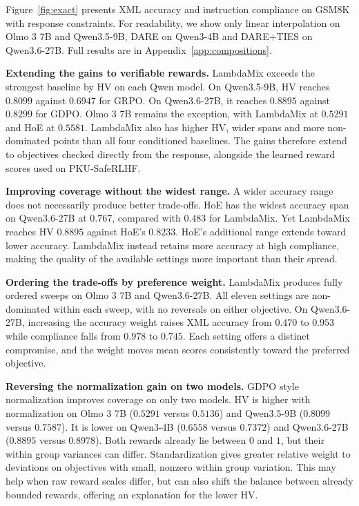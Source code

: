 \documentclass{article} %
\begin{document}
Figure~\ref{fig:exact} presents XML accuracy and instruction compliance on GSM8K with response constraints. For readability, we show only linear interpolation on Olmo 3 7B and Qwen3.5-9B, DARE on Qwen3-4B and DARE+TIES on Qwen3.6-27B. Full results are in Appendix~\ref{app:compositions}.

\textbf{Extending the gains to verifiable rewards.} LambdaMix exceeds the strongest baseline by HV on each Qwen model. On Qwen3.5-9B, HV reaches $0.8099$ against $0.6947$ for GRPO. On Qwen3.6-27B, it reaches $0.8895$ against $0.8299$ for GDPO. Olmo 3 7B remains the exception, with LambdaMix at $0.5291$ and HoE at $0.5581$. LambdaMix also has higher HV, wider spans and more non-dominated points than all four conditioned baselines. The gains therefore extend to objectives checked directly from the response, alongside the learned reward scores used on PKU-SafeRLHF.

\textbf{Improving coverage without the widest range.} A wider accuracy range does not necessarily produce better trade-offs. HoE has the widest accuracy span on Qwen3.6-27B at $0.767$, compared with $0.483$ for LambdaMix. Yet LambdaMix reaches HV $0.8895$ against HoE's $0.8233$. HoE's additional range extends toward lower accuracy. LambdaMix instead retains more accuracy at high compliance, making the quality of the available settings more important than their spread.

\textbf{Ordering the trade-offs by preference weight.} LambdaMix produces fully ordered sweeps on Olmo 3 7B and Qwen3.6-27B. All eleven settings are non-dominated within each sweep, with no reversals on either objective. On Qwen3.6-27B, increasing the accuracy weight raises XML accuracy from $0.470$ to $0.953$ while compliance falls from $0.978$ to $0.745$. Each setting offers a distinct compromise, and the weight moves mean scores consistently toward the preferred objective.

\textbf{Reversing the normalization gain on two models.} GDPO style normalization improves coverage on only two models. HV is higher with normalization on Olmo 3 7B ($0.5291$ versus $0.5136$) and Qwen3.5-9B ($0.8099$ versus $0.7587$). It is lower on Qwen3-4B ($0.6558$ versus $0.7372$) and Qwen3.6-27B ($0.8895$ versus $0.8978$). Both rewards already lie between $0$ and $1$, but their within group variances can differ. Standardization gives greater relative weight to deviations on objectives with small, nonzero within group variation. This may help when raw reward scales differ, but can also shift the balance between already bounded rewards, offering an explanation for the lower HV.
\end{document}
